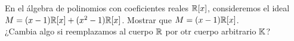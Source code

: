 \item En el álgebra de polinomios con coeficientes reales $\mathbb{R}[x]$, consideremos el ideal $M=(x-1)\mathbb{R}[x]+(x^2-1)\mathbb{R}[x]$. Mostrar que $M=(x-1)\mathbb{R}[x]$.\\
    ¿Cambia algo si reemplazamos al cuerpo $\mathbb{R}$ por otr cuerpo arbitrario $\mathbb{K}$?
    \begin{mdframed}[style=s]
        
    \end{mdframed}